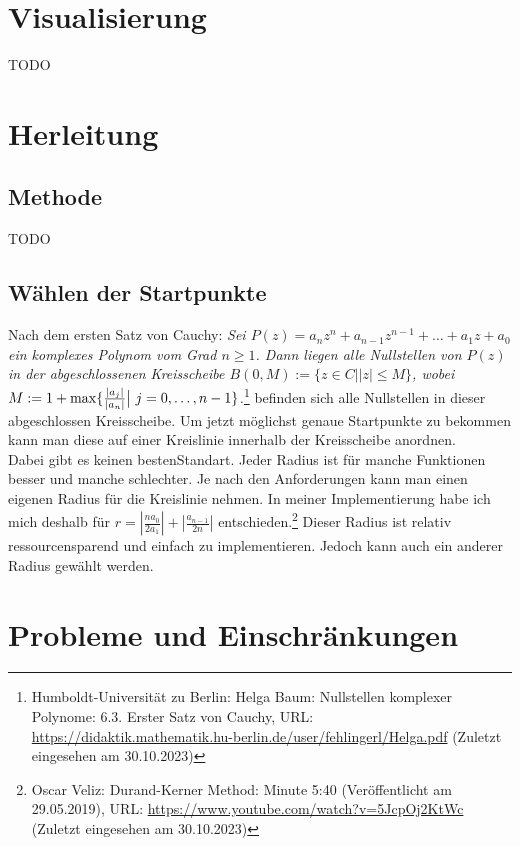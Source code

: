 \documentclass[12pt]{article}
\begin{document}
\section{Visualisierung}
TODO


\section{Herleitung}
\subsection{Methode}
TODO

\subsection{Wählen der Startpunkte}
Nach dem ersten Satz von Cauchy: \glqq\textit{Sei $P(z) = a_nz^n+a_{n-1}z^{n-1}+\dots+a_1z+a_0$ ein komplexes Polynom vom Grad $n \ge 1$. Dann liegen alle Nullstellen von $P(z)$ in der abgeschlossenen Kreisscheibe $B(0,M) := \{z \in C \bigr| |z| \le M\}$, wobei $M := 1 + \max\{\frac{|a_j|}{|a_n|}\bigr|\text{\space}j=0,\dots,n-1\}$.}\grqq\footnote{Humboldt-Universität zu Berlin: Helga Baum: Nullstellen komplexer Polynome: 6.3. Erster Satz von Cauchy, URL: \url{https://didaktik.mathematik.hu-berlin.de/user/fehlingerl/Helga.pdf} (Zuletzt eingesehen am 30.10.2023)} befinden sich alle Nullstellen in dieser abgeschlossen Kreisscheibe. Um jetzt möglichst genaue Startpunkte zu bekommen kann man diese auf einer Kreislinie innerhalb der Kreisscheibe anordnen. \\
Dabei gibt es keinen \glqq besten\grqq\space Standart. Jeder Radius ist für manche Funktionen besser und manche schlechter. Je nach den Anforderungen kann man einen eigenen Radius für die Kreislinie nehmen. In meiner Implementierung habe ich mich deshalb für $r = |\frac{na_0}{2a_1}| + |\frac{a_{n-1}}{2n}|$ entschieden.\footnote{
    Oscar Veliz: Durand-Kerner Method: Minute 5:40 (Veröffentlicht am 29.05.2019), URL: \url{https://www.youtube.com/watch?v=5JcpOj2KtWc} (Zuletzt eingesehen am 30.10.2023)
} Dieser Radius ist relativ ressourcensparend und einfach zu implementieren. Jedoch kann auch ein anderer Radius gewählt werden.

\section{Probleme und Einschränkungen}
\end{document}
